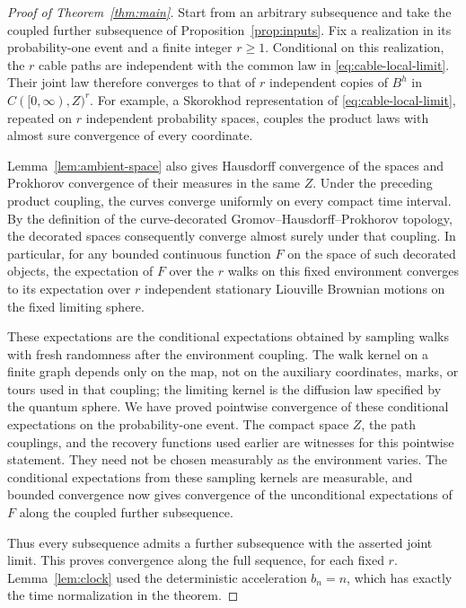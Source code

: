 \begin{proof}[Proof of Theorem~\ref{thm:main}]\label{proofmain}
Start from an arbitrary subsequence and take the coupled further
subsequence of Proposition~\ref{prop:inputs}.  Fix a realization in
its probability-one event and a finite integer $r\ge1$.
Conditional on this realization, the $r$ cable paths are independent
with the common law in \eqref{eq:cable-local-limit}.  Their joint law
therefore converges to that of $r$ independent copies of $B^h$ in
$C([0,\infty),Z)^r$.  For example, a Skorokhod representation of
\eqref{eq:cable-local-limit}, repeated on $r$ independent probability
spaces, couples the product laws with almost sure convergence of every
coordinate.

Lemma~\ref{lem:ambient-space} also gives Hausdorff convergence of the
spaces and Prokhorov convergence of their measures in the same $Z$.
Under the preceding product coupling, the curves converge uniformly on
every compact time interval.  By the definition of the curve-decorated
Gromov--Hausdorff--Prokhorov topology, the decorated spaces consequently
converge almost surely under that coupling.  In particular, for any
bounded continuous function $F$ on the space of such decorated objects,
the expectation of $F$ over the $r$ walks on this fixed environment
converges to its expectation over $r$ independent stationary Liouville
Brownian motions on the fixed limiting sphere.

These expectations are the conditional expectations obtained by sampling
walks with fresh randomness after the environment coupling.  The walk
kernel on a finite graph depends only on the map, not on the auxiliary
coordinates, marks, or tours used in that coupling; the limiting kernel
is the diffusion law specified by the quantum sphere.  We have proved
pointwise convergence of these conditional expectations on the
probability-one event.  The compact space $Z$, the path couplings, and
the recovery functions used earlier are witnesses for this pointwise
statement.  They need not be chosen measurably as the environment varies.
The conditional expectations from these sampling kernels are measurable,
and bounded convergence now gives convergence of the unconditional
expectations of $F$ along the coupled further subsequence.

Thus every subsequence admits a further subsequence with the asserted
joint limit.  This proves convergence along the full sequence, for
each fixed $r$.  Lemma~\ref{lem:clock} used the deterministic
acceleration $b_n=n$, which has exactly the time normalization in the
theorem.
\end{proof}
